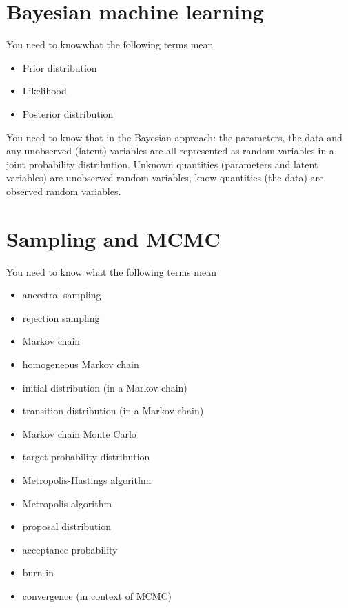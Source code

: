 \documentclass{article}
\newcommand{\yntk}{You need to know}
\begin{document}
\section{Bayesian machine learning}
\label{sec:bayesian}

\yntk what the following terms mean
\begin{itemize}
\item Prior distribution
\item Likelihood
\item Posterior distribution
\end{itemize}

\yntk{} that in the Bayesian approach: the parameters, the data and
any unobserved (latent) variables are all represented as random
variables in a joint probability distribution. Unknown quantities
(parameters and latent variables) are unobserved random variables,
know quantities (the data) are observed random variables.

\section{Sampling and MCMC}
\label{sec:mcmc}

\yntk{} what the following terms mean
\begin{itemize}
\item ancestral sampling
\item rejection sampling
\item Markov chain
\item homogeneous Markov chain
\item initial distribution (in a Markov chain)
\item transition distribution (in a Markov chain)
\item Markov chain Monte Carlo
\item target probability distribution
\item Metropolis-Hastings algorithm
\item Metropolis algorithm
\item proposal distribution
\item acceptance probability
\item burn-in
\item convergence (in context of MCMC)
\end{itemize}
\end{document}
